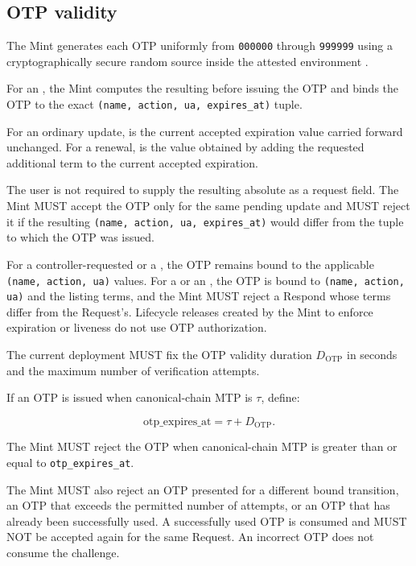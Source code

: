 \subsection{OTP validity}

The Mint generates each OTP uniformly from \texttt{000000} through \texttt{999999} using a cryptographically secure random source inside the attested environment \cite{zns-mint}.

For an , the Mint computes the resulting  before issuing the OTP and binds the OTP to the exact \texttt{(name, action, ua, expires\_at)} tuple.

For an ordinary update,  is the current accepted expiration value carried forward unchanged. For a renewal,  is the value obtained by adding the requested additional term to the current accepted expiration.

The user is not required to supply the resulting absolute  as a request field. The Mint MUST accept the OTP only for the same pending update and MUST reject it if the resulting \texttt{(name, action, ua, expires\_at)} would differ from the tuple to which the OTP was issued.

For a controller-requested  or a , the OTP remains bound to the applicable \texttt{(name, action, ua)} values. For a  or an , the OTP is bound to \texttt{(name, action, ua)} and the listing terms, and the Mint MUST reject a Respond whose terms differ from the Request's. Lifecycle releases created by the Mint to enforce expiration or liveness do not use OTP authorization.

The current \zns{} deployment MUST fix the OTP validity duration $D_{\text{OTP}}$ in seconds and the maximum number of verification attempts.

If an OTP is issued when canonical-chain MTP is $\tau$, define:

$$\text{otp\_expires\_at} = \tau + D_{\text{OTP}}.$$

The Mint MUST reject the OTP when canonical-chain MTP is greater than or equal to \texttt{otp\_expires\_at}.

The Mint MUST also reject an OTP presented for a different bound transition, an OTP that exceeds the permitted number of attempts, or an OTP that has already been successfully used. A successfully used OTP is consumed and MUST NOT be accepted again for the same Request. An incorrect OTP does not consume the challenge.

